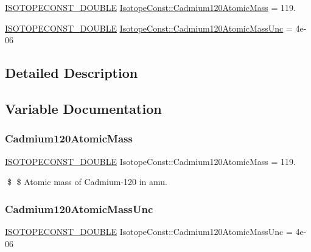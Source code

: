 \begin{DoxyCompactItemize}
\item 
\mbox{\hyperlink{group___isotope_const-_macros_ga8f45a7272ce02c0b4c65c44636ed719a}{I\+S\+O\+T\+O\+P\+E\+C\+O\+N\+S\+T\+\_\+\+D\+O\+U\+B\+LE}} \mbox{\hyperlink{group___isotope_const-_cadmium-_cd120_ga4fa1f08a46e933ffea356ceede43a998}{Isotope\+Const\+::\+Cadmium120\+Atomic\+Mass}} = 119.
\item 
\mbox{\hyperlink{group___isotope_const-_macros_ga8f45a7272ce02c0b4c65c44636ed719a}{I\+S\+O\+T\+O\+P\+E\+C\+O\+N\+S\+T\+\_\+\+D\+O\+U\+B\+LE}} \mbox{\hyperlink{group___isotope_const-_cadmium-_cd120_ga426fcc142a97e641b9c1010f49bb6d7b}{Isotope\+Const\+::\+Cadmium120\+Atomic\+Mass\+Unc}} = 4e-\/06
\end{DoxyCompactItemize}


\subsection{Detailed Description}


\subsection{Variable Documentation}
\mbox{\label{group___isotope_const-_cadmium-_cd120_ga4fa1f08a46e933ffea356ceede43a998}} 
\subsubsection{\texorpdfstring{Cadmium120\+Atomic\+Mass}{Cadmium120AtomicMass}}
{\footnotesize\ttfamily \mbox{\hyperlink{group___isotope_const-_macros_ga8f45a7272ce02c0b4c65c44636ed719a}{I\+S\+O\+T\+O\+P\+E\+C\+O\+N\+S\+T\+\_\+\+D\+O\+U\+B\+LE}} Isotope\+Const\+::\+Cadmium120\+Atomic\+Mass = 119.}

\$ \$ Atomic mass of Cadmium-\/120 in amu. \mbox{\label{group___isotope_const-_cadmium-_cd120_ga426fcc142a97e641b9c1010f49bb6d7b}} 
\subsubsection{\texorpdfstring{Cadmium120\+Atomic\+Mass\+Unc}{Cadmium120AtomicMassUnc}}
{\footnotesize\ttfamily \mbox{\hyperlink{group___isotope_const-_macros_ga8f45a7272ce02c0b4c65c44636ed719a}{I\+S\+O\+T\+O\+P\+E\+C\+O\+N\+S\+T\+\_\+\+D\+O\+U\+B\+LE}} Isotope\+Const\+::\+Cadmium120\+Atomic\+Mass\+Unc = 4e-\/06}

